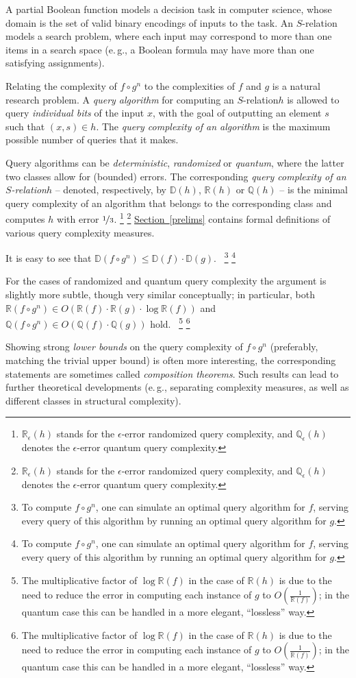 \documentclass[11pt]{article}
\numberwithin{equation}{section}
\theoremstyle{definition}
\theoremstyle{plain}
\newcommand{\R}{\mathbb R}
\newcommand{\Q}{\mathbb Q}
\newcommand{\eg}{e.\,g.}
\newcommand{\expref}[2]{\hyperref[#2]{#1~\ref{#2}}}
\newcommand{\relation}{$S$-relation\xspace}     %
\newcommand{\arelation}{an $S$-relation\xspace} %
\newcommand{\dr}{\nicefrac}
\newcommand{\asO}[1]{O(#1)}
\newcommand{\fn}[2][]{%
\ifthenelse{\equal{}{#1}}%
{\footnote{#2}}%
{\footnote{\label{#1}#2}}%
}
\newcommand{\tm}{\cdot}
\newcommand{\e}{\emph}
\newcommand{\D}{\mathbb{D}}
\begin{document}
%
A partial Boolean function models a decision task in computer science, whose domain is the set of valid binary encodings of inputs to the task. An \relation models a search problem, where each input may correspond to more than one items in a search space (\eg, a Boolean formula may have more than one satisfying assignments).

Relating the complexity of $f \circ g^n$ to the complexities of $f$ and $g$ is a natural research problem.
%
%
%
A \e{query algorithm} for computing %
\arelation $h$  %
is allowed to query \e{individual bits} of the input $x$, with the goal of outputting an element $s$ such that $(x, s) \in h $.
%
%
%
The \e{query complexity of an algorithm} is the maximum possible number of queries that it makes.

Query algorithms can be \e{deterministic}, \e{randomized} or \e{quantum}, where the latter two classes allow for (bounded) errors.
The corresponding \e{query complexity of
%
\arelation $h$}
-- denoted, respectively, by $\D(h)$, $\R(h)$ or $\Q(h)$ -- is the minimal query complexity of an algorithm that belongs to the corresponding class and computes $h$ with error $\dr13$. 
\fn{%
 $\R_\epsilon(h)$
%
  stands for the
$\epsilon$-error  %
  randomized %
  query complexity,
%
and $\Q_\epsilon(h)$ denotes the $\epsilon$-error
quantum query complexity.  %
} \expref{Section}{prelims} contains formal definitions of various query complexity measures.

It is easy to see that $\D(f \circ g^n) \leq \D(f) \cdot \D(g)$.~\fn
{To compute $f\circ g^n$, one can simulate an optimal query algorithm for $f$, serving every query of this algorithm by running an optimal query algorithm for $g$.}
For the cases of randomized and quantum query complexity the argument is slightly more subtle, though very similar conceptually; in particular, both $\R(f \circ g^n) \in \asO{\R(f) \cdot \R(g) \tm \log \R(f)}$ and $\Q(f \circ g^n) \in \asO{\Q(f) \cdot \Q(g)}$ hold.~\fn
{The multiplicative factor of $\log \R(f)$ in the case of $\R(h)$ is due to the need to reduce the error in computing each instance of $g$ to $\asO{\frac{1}{\R(f)}}$; in the quantum case this can be handled in a more elegant, ``lossless'' way.}

Showing strong \emph{lower bounds} on the query complexity of $f \circ g^n$ (preferably, matching the trivial upper bound) is often more interesting, the corresponding statements are sometimes called \emph{composition theorems}.
Such results can lead to further theoretical developments (\eg, separating complexity measures, as well as different classes in structural complexity).
\end{document}
